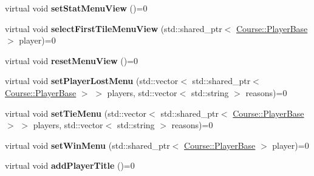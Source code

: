 \begin{DoxyCompactItemize}
\item 
\hypertarget{class_student_1_1i_menu_object_manager_a839b140efee6197dfd0b36f9078f6bde}{virtual void {\bfseries set\-Stat\-Menu\-View} ()=0}\label{class_student_1_1i_menu_object_manager_a839b140efee6197dfd0b36f9078f6bde}

\item 
\hypertarget{class_student_1_1i_menu_object_manager_a1ccf610acaaece6d36831229e638921f}{virtual void {\bfseries select\-First\-Tile\-Menu\-View} (std\-::shared\-\_\-ptr$<$ \hyperlink{class_course_1_1_player_base}{Course\-::\-Player\-Base} $>$ player)=0}\label{class_student_1_1i_menu_object_manager_a1ccf610acaaece6d36831229e638921f}

\item 
\hypertarget{class_student_1_1i_menu_object_manager_abeb62c74b08b4c79e652a318fb000fda}{virtual void {\bfseries reset\-Menu\-View} ()=0}\label{class_student_1_1i_menu_object_manager_abeb62c74b08b4c79e652a318fb000fda}

\item 
\hypertarget{class_student_1_1i_menu_object_manager_ad06c93b3119457664bf1afaec5f1dfc3}{virtual void {\bfseries set\-Player\-Lost\-Menu} (std\-::vector$<$ std\-::shared\-\_\-ptr$<$ \hyperlink{class_course_1_1_player_base}{Course\-::\-Player\-Base} $>$ $>$ players, std\-::vector$<$ std\-::string $>$ reasons)=0}\label{class_student_1_1i_menu_object_manager_ad06c93b3119457664bf1afaec5f1dfc3}

\item 
\hypertarget{class_student_1_1i_menu_object_manager_a68e4b4c3462951b386312a69685ef97c}{virtual void {\bfseries set\-Tie\-Menu} (std\-::vector$<$ std\-::shared\-\_\-ptr$<$ \hyperlink{class_course_1_1_player_base}{Course\-::\-Player\-Base} $>$ $>$ players, std\-::vector$<$ std\-::string $>$ reasons)=0}\label{class_student_1_1i_menu_object_manager_a68e4b4c3462951b386312a69685ef97c}

\item 
\hypertarget{class_student_1_1i_menu_object_manager_acaf9c264ae76d4d7490ee8e7f8379758}{virtual void {\bfseries set\-Win\-Menu} (std\-::shared\-\_\-ptr$<$ \hyperlink{class_course_1_1_player_base}{Course\-::\-Player\-Base} $>$ player)=0}\label{class_student_1_1i_menu_object_manager_acaf9c264ae76d4d7490ee8e7f8379758}

\item 
\hypertarget{class_student_1_1i_menu_object_manager_a126fb4720d7ee471b1212f23142a50c9}{virtual void {\bfseries add\-Player\-Title} ()=0}\label{class_student_1_1i_menu_object_manager_a126fb4720d7ee471b1212f23142a50c9}


\end{DoxyCompactItemize}
